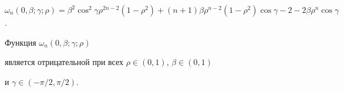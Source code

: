 $\omega_n(0,\beta;\gamma;\rho)=\beta^2\cos^2\gamma\rho^{2n-2}


(1-\rho^2)+(n+1)\beta\rho^{n-2}(1-\rho^2)\cos\gamma-2-


2\beta\rho^n\cos\gamma$.





\begin{lem}


Функция $\omega_n(0,\beta;\gamma;\rho)$


является отрицательной при всех $\rho\in(0,1)$, $\beta\in(0,1)$


и $\gamma\in(-\pi/2,\pi/2)$.


\end{lem}





